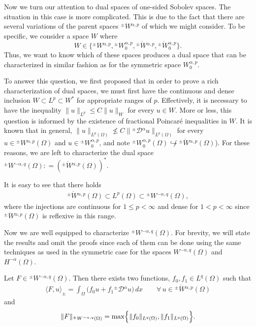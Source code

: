 \documentclass[leqno,final]{siamltex}
\numberwithin{equation}{section}
\newcommand{\Ome}{{\Omega}}
\renewcommand{\(}{\bigl(}
\renewcommand{\)}{\bigr)}
\begin{document}
   \medskip
   Now we turn our attention to dual spaces of one-sided Sobolev spaces. The situation in this case is more complicated. This is due to the fact that there are several variations of the parent spaces ${^{\pm}}{W}{^{\alpha,p}}$ of which we might consider. To be specific, we consider 
   a space $W$ where 
   \[
   W \in \bigl\{ {^{\pm}}{W}{^{\alpha,p}}, {^{\pm}}{W}{^{\alpha,p}_{0}}, {^{\pm}}{\mathring{W}}{^{\alpha,p}}, {^{\pm}}{\mathring{W}}{^{\alpha,p}_{0}} \bigr\}.
   \]
    Thus, we want to know which of these spaces produces a dual space that can be characterized 
    in similar fashion as for the symmetric space $W^{\alpha,p}_{0}$.
   
   To answer this question, we first proposed that in order to prove a rich characterization of dual spaces, we must first have the continuous and dense inclusion $W \subset L^{p} \subset W^{*}$ for appropriate ranges of $p$. Effectively, it is necessary to have the inequality $\|u \|
   _{L^{p}} \leq C \|u\|_{W}$ for every $u \in W$. More or less, this question is informed by the existence of fractional Poincar\'e inequalities in $W$. It is known that in general, $\|u \|_{L^{p}(\Omega)} \not\leq C \| {^{\pm}}{\mathcal{D}}{^{\alpha}} u \|_{L^{p}(\Omega)}$ 
   for every $u \in {^{\pm}}{W}{^{\alpha,p}}(\Omega)$ and $u\in {^{\pm}}{W}{^{\alpha,p}_{0}}$, 
   and note  ${^{\pm}}{W}{^{\alpha,p}_{0}}(\Omega) \not\hookrightarrow {^{\pm}}{\mathring{W}}{^{\alpha,p}}(\Omega)$). For these reasons, we are left to characterize the dual space ${^{\pm}}{W}{^{-\alpha, q}}(\Omega) : = ({^{\pm}}{\mathring{W}}{^{\alpha,p}}(\Omega))^{*}$.
   
   It is easy to see that there holds 
   \begin{align}
       {^{\pm}}{\mathring{W}}{^{\alpha,p}}(\Omega) \subset L^{p}(\Omega) \subset {^{\pm}}{W}{^{-\alpha,q}}(\Omega),
   \end{align}
   where the injections are continuous for $1 \leq p < \infty$ and dense for $1 < p < \infty$ since ${^{\pm}}{\mathring{W}}{^{\alpha,p}}(\Omega)$ is reflexive in this range. 
   
   Now we are well equipped to characterize ${^{\pm}}{W}{^{-\alpha,q}}(\Omega)$. For brevity, we will state the results and omit the proofs since each of them can be done using the same techniques as used in the symmetric case for the spaces $W^{-\alpha,q}(\Ome)$ and $H^{-\alpha}(\Ome)$. 
   
   \begin{theorem}
   Let $F \in {^{\pm}}{W}{^{-\alpha,q}}(\Omega)$. Then there exists two functions, $f_0 , f_1 \in L^{q}(\Omega)$ such that 
   \begin{align}\label{DualCharacterization}
    \langle F, u \rangle _{\pm} = \int_{\Omega} \bigl( f_0 u + f_1 {^{\pm}}{\mathcal{D}}{^{\alpha}} u \bigr)\, dx \qquad \forall \, u \in {^{\pm}}{\mathring{W}}{^{\alpha,p}}(\Omega)
   \end{align}
   and 
   \begin{align}
       \|F\|_{{^{\pm}}{W}{^{-\alpha , q}}(\Omega)} = \max \Bigl\{ \|f_0\|_{L^{q}(\Omega)} , \|f_1\|_{L^{q}(\Omega)} \Bigr\}.
   \end{align}
   \end{theorem}
   
\end{document}
